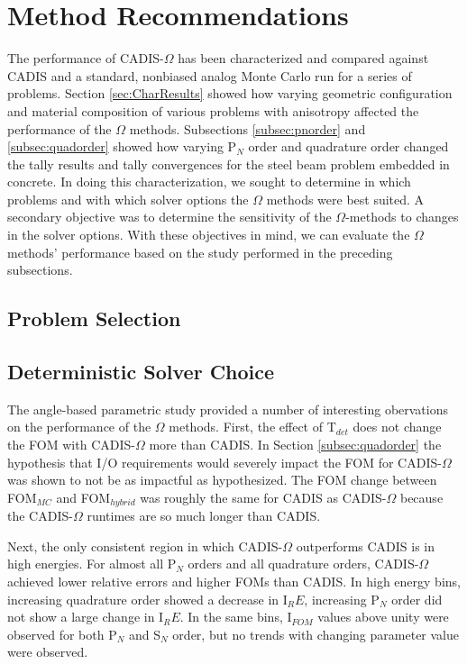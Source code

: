 \section{Method Recommendations}
\label{sec:method_recs}

The performance of CADIS-$\Omega$ has been characterized and compared against
CADIS and a standard, nonbiased analog Monte Carlo run for a series of problems.
Section \ref{sec:CharResults} showed how varying geometric configuration and
material composition of various problems with anisotropy affected the
performance of the $\Omega$ methods.
Subsections \ref{subsec:pnorder} and \ref{subsec:quadorder} showed how varying
P$_N$ order and quadrature order changed the tally results and tally
convergences for the steel beam problem embedded in concrete. In doing this
characterization, we sought to determine in which problems and with which solver
options the $\Omega$ methods were best suited. A secondary objective was to
determine the sensitivity of the $\Omega$-methods to changes in the solver
options. With these objectives in mind, we can evaluate the $\Omega$ methods'
performance based on the study performed in the preceding subsections.

\subsection{Problem Selection}
\label{sec:materials_recs}

\subsection{Deterministic Solver Choice}
\label{sec:deterministic_recs}

The angle-based parametric study provided a number of interesting obervations on
the performance of the $\Omega$ methods.
First, the effect of T$_{det}$ does not change the FOM with CADIS-$\Omega$ more
than CADIS. In
Section \ref{subsec:quadorder} the hypothesis that I/O requirements would severely
impact the FOM for CADIS-$\Omega$ was shown to not be as impactful as
hypothesized. The FOM change between
FOM$_{MC}$ and FOM$_{hybrid}$ was roughly the same for CADIS as CADIS-$\Omega$
because the CADIS-$\Omega$ runtimes are so much longer than CADIS.

Next, the only consistent region in which CADIS-$\Omega$ outperforms CADIS is in
high energies. For almost all P$_N$ orders and all quadrature orders, CADIS-$\Omega$
achieved lower relative errors and higher FOMs than CADIS. In high energy bins,
increasing quadrature order showed a decrease in I$_RE$, increasing P$_N$ order
did not show a large change in I$_RE$. In the same bins, I$_{FOM}$ values above
unity were observed for both P$_N$ and S$_N$ order, but no trends with changing
parameter value were observed.


